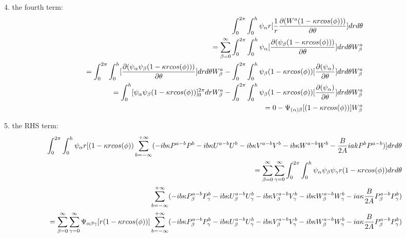\documentclass{Note}
\begin{document}
4. the fourth term:
\begin{equation}
\begin{aligned}
\int_0^{2\pi}\int_0^h \psi_\alpha r [{1\over r}{\partial(W^a (1-\kappa r cos(\phi)))\over \partial \theta}] dr d\theta\\
=\sum_{\beta=0}^\infty \int_0^{2\pi}\int_0^h \psi_\alpha  [{\partial(\psi_\beta (1-\kappa r cos(\phi)))\over \partial \theta}] dr d\theta W_\beta^a\\
=\int_0^{2\pi}\int_0^h  [{\partial(\psi_\alpha  \psi_\beta (1-\kappa r cos(\phi)))\over \partial \theta}] dr d\theta W_\beta^a
-\int_0^{2\pi}\int_0^h  \psi_\beta (1-\kappa r cos(\phi))[{\partial(\psi_\alpha )\over \partial \theta}] dr d\theta W_\beta^a\\
=\int_0^h  [\psi_\alpha  \psi_\beta (1-\kappa r cos(\phi))]_0^{2\pi} dr W_\beta^a
-\int_0^{2\pi}\int_0^h  \psi_\beta (1-\kappa r cos(\phi))[{\partial(\psi_\alpha )\over \partial \theta}] dr d\theta W_\beta^a\\
=0-\Psi_{(\alpha)\beta}[ (1-\kappa r cos(\phi))]W_\beta^a
\end{aligned}
\end{equation}


5. the RHS term:
\begin{equation}
\begin{aligned}
\int_0^{2\pi}\int_0^h \psi_\alpha r [(1-\kappa r cos(\phi))\sum_{b=-\infty}^{+\infty}(-ib\kappa P^{a-b} P^{b} -ib\kappa U^{a-b} U^{b}-ib\kappa V^{a-b} V^{b}-ib\kappa W^{a-b} W^{b}  - {B\over {2A}}iakP^bP^{a-b})] dr d\theta\\
=\sum_{\beta=0}^{\infty} \sum _{\gamma=0}^{\infty} \int_0^{2\pi}\int_0^h \psi_\alpha \psi_\beta \psi_\gamma r  (1-\kappa r cos(\phi)) drd\theta \\  \sum_{b=-\infty}^{+\infty}(-ib\kappa P_\beta^{a-b} P_\gamma^{b}-ib\kappa U_\beta^{a-b} U_\gamma^{b}-ib\kappa V_\beta^{a-b} V_\gamma^{b}-ib\kappa  W_\beta^{a-b} W_\gamma^{b}-ia\kappa  {B\over {2A}}P_\beta^{a-b}P_\gamma^{b})\\
=\sum_{\beta=0}^{\infty} \sum _{\gamma=0}^{\infty} \Psi_{\alpha\beta\gamma}[r(1-\kappa r cos(\phi))] \sum_{b=-\infty}^{+\infty}(-ib\kappa P_\beta^{a-b} P_\gamma^{b}-ib\kappa U_\beta^{a-b} U_\gamma^{b}-ib\kappa V_\beta^{a-b} V_\gamma^{b}-ib\kappa  W_\beta^{a-b} W_\gamma^{b}-ia\kappa  {B\over {2A}}P_\beta^{a-b}P_\gamma^{b})\\
\end{aligned}
\end{equation}
\end{document}
